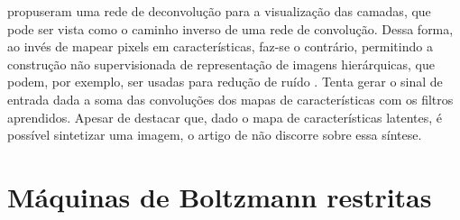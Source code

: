 
 propuseram uma rede de deconvolução para a visualização das camadas, que pode ser vista como o caminho inverso de uma rede de convolução. Dessa forma, ao invés de mapear pixels em características, faz-se o contrário, permitindo a construção não supervisionada de representação de imagens hierárquicas, que podem, por exemplo, ser usadas para redução de ruído \cite{Zeiler2013}. Tenta gerar o sinal de entrada dada a soma das convoluções dos mapas de características com os filtros aprendidos. Apesar de destacar que, dado o mapa de características latentes, é possível sintetizar uma imagem, o artigo de  não discorre sobre essa síntese.






\section{Máquinas de Boltzmann restritas}
\label{sec:rbm}

